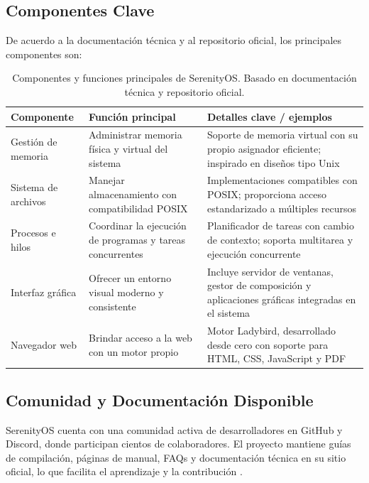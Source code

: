 \subsection{Componentes Clave}
De acuerdo a la documentación técnica y al repositorio oficial, los principales componentes son:
\begin{table}[H]
\centering
\begin{tabular}{p{3.2cm}p{5cm}p{6cm}}
\hline
\textbf{Componente} & \textbf{Función principal} & \textbf{Detalles clave / ejemplos} \\
\hline
Gestión de memoria & Administrar memoria física y virtual del sistema & Soporte de memoria virtual con su propio asignador eficiente; inspirado en diseños tipo Unix \\
\hline
Sistema de archivos & Manejar almacenamiento con compatibilidad POSIX & Implementaciones compatibles con POSIX; proporciona acceso estandarizado a múltiples recursos \\
\hline
Procesos e hilos & Coordinar la ejecución de programas y tareas concurrentes & Planificador de tareas con cambio de contexto; soporta multitarea y ejecución concurrente \\
\hline
Interfaz gráfica & Ofrecer un entorno visual moderno y consistente & Incluye servidor de ventanas, gestor de composición y aplicaciones gráficas integradas en el sistema \\
\hline
Navegador web & Brindar acceso a la web con un motor propio & Motor Ladybird, desarrollado desde cero con soporte para HTML, CSS, JavaScript y PDF \\
\hline
\end{tabular}
\caption[Componentes y funciones clave de SerenityOS]{Componentes y funciones principales de SerenityOS. Basado en documentación técnica y repositorio oficial.}
\label{tab:componentes-serenityos}
\end{table}

\subsection{Comunidad y Documentación Disponible}
SerenityOS cuenta con una comunidad activa de desarrolladores en GitHub y Discord, 
donde participan cientos de colaboradores. 
El proyecto mantiene guías de compilación, páginas de manual, FAQs y 
documentación técnica en su sitio oficial, lo que facilita el aprendizaje 
y la contribución \parencite{serenityos:website}. 


